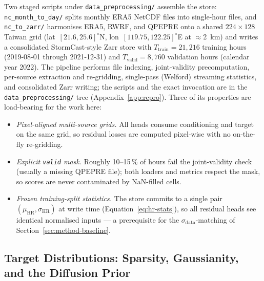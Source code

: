Two staged scripts under \texttt{data\_preprocessing/} assemble the store: \texttt{nc\_month\_to\_day/} splits monthly ERA5 NetCDF files into single-hour files, and \texttt{nc\_to\_zarr/} harmonises ERA5, RWRF, and QPEPRE onto a shared $224 \times 128$ Taiwan grid (lat~$[21.6, 25.6]^{\circ}$N, lon~$[119.75, 122.25]^{\circ}$E at $\approx$\SI{2}{\kilo\metre}) and writes a consolidated StormCast-style Zarr store with $T_{\text{train}} = 21{,}216$ training hours (2019-08-01 through 2021-12-31) and $T_{\text{valid}} = 8{,}760$ validation hours (calendar year 2022). The pipeline performs file indexing, joint-validity precomputation, per-source extraction and re-gridding, single-pass (Welford) streaming statistics, and consolidated Zarr writing; the scripts and the exact invocation are in the \texttt{data\_preprocessing/} tree (Appendix~\ref{app:repro}). Three of its properties are load-bearing for the work here:
\begin{itemize}
  \item \emph{Pixel-aligned multi-source grids.} All heads consume conditioning and target on the same grid, so residual losses are computed pixel-wise with no on-the-fly re-gridding.
  \item \emph{Explicit \texttt{valid} mask.} Roughly 10--15\,\% of hours fail the joint-validity check (usually a missing QPEPRE file); both loaders and metrics respect the mask, so scores are never contaminated by NaN-filled cells.
  \item \emph{Frozen training-split statistics.} The store commits to a single pair $(\mu_{\text{HR}}, \sigma_{\text{HR}})$ at write time (Equation~\ref{eq:hr-stats}), so all residual heads see identical normalised inputs --- a prerequisite for the $\sigma_{\text{data}}$-matching of Section~\ref{sec:method-baseline}.
\end{itemize}

\subsection{Target Distributions: Sparsity, Gaussianity, and the Diffusion Prior}
\label{sec:method-datasources-distributions}

